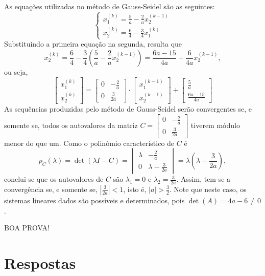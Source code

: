 \documentclass[12pt,a4paper]{article}
\begin{document}
\begin{ExerciseList}
As equações utilizadas no método de Gauss-Seidel são as seguintes:
\[
\begin{cases}
x_1^{(k)} = \frac{5}{a} - \frac{2}{a} x_2^{(k-1)}\\
x_2^{(k)} = \frac{6}{4} - \frac{3}{4}x_1^{(k)}
\end{cases}
\]
Substituindo a primeira equação na segunda, resulta que
\[
x_2^{(k)}
= \frac{6}{4} - \frac{3}{4}\left(\frac{5}{a} - \frac{2}{a} x_2^{(k-1)}\right)
= \frac{6a-15}{4a} + \frac{6}{4a} x_2^{(k-1)},
\]
ou seja,
\[
\begin{bmatrix}
x_1^{(k)}\\
x_2^{(k)}
\end{bmatrix}
=
\begin{bmatrix}
0 & -\frac{2}{a}\\
0 & \frac{3}{2a}
\end{bmatrix}
\cdot
\begin{bmatrix}
x_1^{(k-1)}\\
x_2^{(k-1)}
\end{bmatrix}
+
\begin{bmatrix}
\frac{5}{a}\\
\frac{6a-15}{4a}
\end{bmatrix}
\]
As sequências produzidas pelo método de Gauss-Seidel serão convergentes se, e somente se, todos os autovalores da matriz $C = 
\begin{bmatrix}
0 & -\frac{2}{a}\\
0 & \frac{3}{2a}
\end{bmatrix}$ tiverem módulo menor do que um. Como o polinômio característico de $C$ é
\[
p_C(\lambda) = \det(\lambda I - C)
=
\begin{vmatrix}
\lambda & -\frac{2}{a}\\
0 & \lambda-\frac{3}{2a}
\end{vmatrix}
= \lambda\left(\lambda-\frac{3}{2a}\right),
\]
conclui-se que os autovalores de $C$ são $\lambda_1 = 0$ e $\lambda_2 = \frac{3}{2a}$. Assim, tem-se a convergência se, e somente se, $\left|\frac{3}{2a}\right| < 1$, isto é, $|a| > \frac{3}{2}$. Note que neste caso, os sistemas lineares dados são possíveis e determinados, pois $\det(A) = 4a-6 \neq 0$.
\end{ExerciseList}

\vfill
\begin{center}
BOA PROVA!
\end{center}

\newpage
\restoregeometry
\section*{Respostas}
\shipoutAnswer
\end{document}
